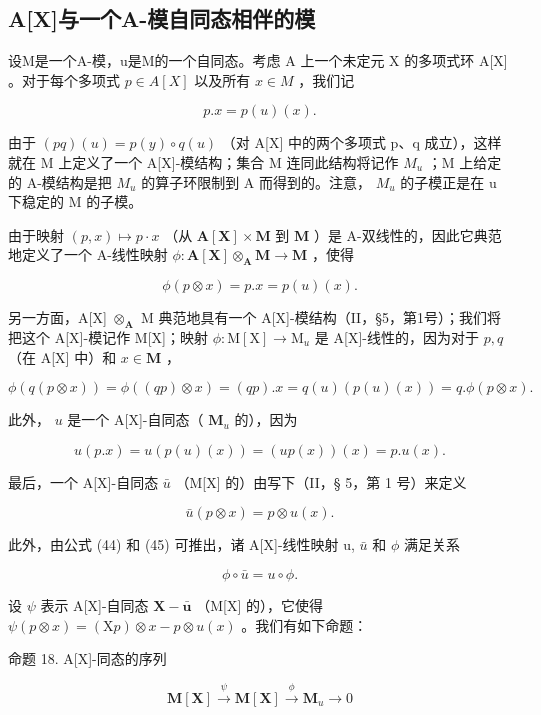 \subsection{A{[}X{]}与一个A-模自同态相伴的模}

设M是一个A-模，u是M的一个自同态。考虑 A 上一个未定元 X 的多项式环 A{[}X{]} 。对于每个多项式 \(p \in A[X]\) 以及所有 \(x \in M\) ，我们记

\[
p. x = p (u) (x).\tag{43}
\]

由于 \((pq)(u) = p(y) \circ q(u)\) （对 A{[}X{]} 中的两个多项式 p、q 成立），这样就在 M 上定义了一个 A{[}X{]}-模结构；集合 M 连同此结构将记作 \(M_{u}\) ；M 上给定的 A-模结构是把 \(M_{u}\) 的算子环限制到 A 而得到的。注意， \(M_{u}\) 的子模正是在 u 下稳定的 M 的子模。

由于映射 \((p, x) \mapsto p \cdot x\) （从 \(\mathbf{A}[\mathbf{X}] \times \mathbf{M}\) 到 \(\mathbf{M}\) ）是 A-双线性的，因此它典范地定义了一个 A-线性映射 \(\phi: \mathbf{A}[\mathbf{X}] \otimes_{\mathbf{A}} \mathbf{M} \to \mathbf{M}\) ，使得

\[
\phi (p \otimes x) = p. x = p (u) (x).\tag{44}
\]

另一方面，A{[}X{]} \(\otimes_{\mathbf{A}}\) M 典范地具有一个 A{[}X{]}-模结构（II，§5，第1号）；我们将把这个 A{[}X{]}-模记作 M{[}X{]}；映射 \(\phi: \mathrm{M}[\mathrm{X}] \to \mathrm{M}_u\) 是 A{[}X{]}-线性的，因为对于 \(p, q\) （在 A{[}X{]} 中）和 \(x \in \mathbf{M}\) ，

\[
\phi (q (p \otimes x)) = \phi ((q p) \otimes x) = (q p). x = q (u) (p (u) (x)) = q. \phi (p \otimes x).
\]

此外， \(u\) 是一个 A{[}X{]}-自同态（ \(\mathbf{M}_u\) 的），因为

\[
u (p. x) = u (p (u) (x)) = (u p (x)) (x) = p. u (x).
\]

最后，一个 A{[}X{]}-自同态 \(\bar{u}\) （M{[}X{]} 的）由写下（II，§ 5，第 1 号）来定义

\[
\bar {u} (p \otimes x) = p \otimes u (x).\tag{45}
\]

此外，由公式 (44) 和 (45) 可推出，诸 A{[}X{]}-线性映射 u, \(\bar{u}\) 和 \(\phi\) 满足关系

\[
\phi \circ \bar {u} = u \circ \phi .\tag{46}
\]

设 \(\psi\) 表示 A{[}X{]}-自同态 \(\mathbf{X} - \bar{\boldsymbol{u}}\) （M{[}X{]} 的），它使得 \(\psi(p \otimes x) = (\mathrm{X}p) \otimes x - p \otimes u(x)\) 。我们有如下命题：

命题 18. A{[}X{]}-同态的序列

\[
\mathbf {M} [ \mathbf {X} ] \stackrel {\psi} {\longrightarrow} \mathbf {M} [ \mathbf {X} ] \stackrel {\phi} {\longrightarrow} \mathbf {M} _ {u} \longrightarrow 0\tag{47}
\]

